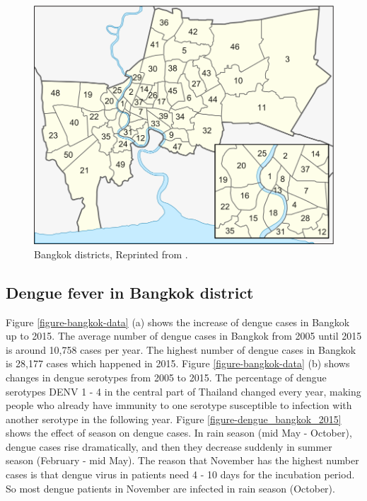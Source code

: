 \documentclass[review]{elsarticle}
\begin{document}
\begin{figure}[htbp]
	\begin{center}
		\includegraphics[width=140mm]{./figures/bangkok_district}
		\caption{ Bangkok districts, Reprinted from \protect\cite{wikibangkok}.}
		\label{figure-bangkok_district}
	\end{center}
\end{figure}

\subsection{Dengue fever in Bangkok district}


Figure \ref{figure-bangkok-data} (a) shows the increase of dengue cases in Bangkok up to 2015. The average number of dengue cases in Bangkok from 2005 until 2015 is around 10,758 cases per year. The highest number of dengue cases in Bangkok is 28,177 cases which happened in 2015. Figure \ref{figure-bangkok-data} (b) shows changes in dengue serotypes from 2005 to 2015. The percentage of dengue serotypes DENV 1 - 4 in the central part of Thailand changed every year, making people who already have immunity to one serotype susceptible to infection with another serotype in the following year. Figure \ref{figure-dengue_bangkok_2015} shows the effect of season on dengue cases. In rain season (mid May - October), dengue cases rise dramatically, and then they decrease suddenly in summer season (February - mid May). The reason that November has the highest number cases is that dengue virus in patients need 4 - 10 days for the incubation period. So most dengue patients in November are infected in rain season (October).  
\end{document}
